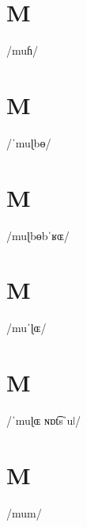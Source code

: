 \documentclass[10pt,a4paper,twoside]{book}
\begin{document}
\section*{M}

\begin{multicols}{3}
 {/muɦ/} {}
\end{multicols}

\section*{M}

\begin{multicols}{3}
 {/ˈmuɭbɵ/} {}
\end{multicols}

\section*{M}

\begin{multicols}{3}
 {/muɭbɵbˈʁɶ/} {}
\end{multicols}

\section*{M}

\begin{multicols}{3}
 {/muˈɭɶ/} {}
\end{multicols}

\section*{M}

\begin{multicols}{3}
 {/ˈmuɭɶ ɴɒt͡sˈuǀ/} {}
\end{multicols}

\section*{M}

\begin{multicols}{3}
 {/mum/} {}
\end{multicols}
\end{document}
